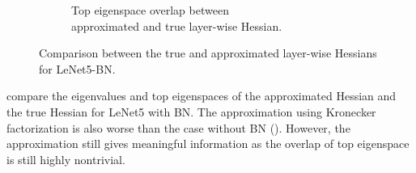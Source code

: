 \begin{figure}[ht]
\begin{subfigure}[b]{0.35\textwidth}
    \caption{Top eigenspace overlap between \\approximated and true layer-wise Hessian.}
    \label{fig:app_exp_bn_approx_overlap}
\end{subfigure}
\caption{Comparison between the true and approximated layer-wise Hessians for LeNet5-BN.}
\label{fig:app_exp_bn_approx}
\end{figure}
 compare the eigenvalues and top eigenspaces of the approximated Hessian and the true Hessian for LeNet5 with BN. The approximation using Kronecker factorization is also worse than the case without BN (). However, the approximation still gives meaningful information as the overlap of top eigenspace is still highly nontrivial.

